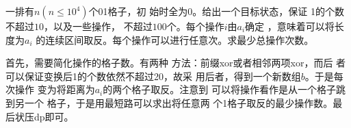 \begin{prob}
	一排有$n(n \le 10^4)$个01格子，初
	始时全为0。给出一个目标状态，保证
	1的个数不超过$10$，以及一些操作，
	不超过$100$个。每个操作$i$由$a_i$确定
	，意味着可以将长度为$a_i$
	的连续区间取反。每个操作可以进行任意次。求最少总操作次数。
\end{prob}

\begin{sol}
	首先，需要简化操作的格子数。有两种
	方法：前缀xor或者相邻两项xor，而后
	者可以保证变换后1的个数依然不超过20，故采
	用后者，得到一个新数组$b$。于是每次操作
	变为将距离为$a_i$的两个格子取反。注意到
	可以将操作看作是从一个格子跳到另一个
	格子，于是用最短路可以求出将任意两
	个1格子取反的最少操作数。最后状压dp即可。
\end{sol}
